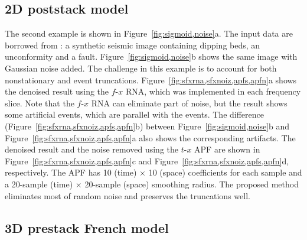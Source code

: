 
\subsection{2D poststack model}
The second example is shown in Figure~\ref{fig:sigmoid,noise}a.  The
input data are borrowed from \cite{Claerbout09}: a synthetic seismic
image containing dipping beds, an unconformity and a
fault. Figure~\ref{fig:sigmoid,noise}b shows the same image with
Gaussian noise added. The challenge in this example is to account for
both nonstationary and event
truncations. Figure~\ref{fig:sfxrna,sfxnoiz,apfs,apfn}a shows the
denoised result using the $f$-$x$ RNA, which was implemented in each
frequency slice. Note that the $f$-$x$ RNA can eliminate part of
noise, but the result shows some artificial events, which are parallel
with the events. The difference
(Figure~\ref{fig:sfxrna,sfxnoiz,apfs,apfn}b) between
Figure~\ref{fig:sigmoid,noise}b and
Figure~\ref{fig:sfxrna,sfxnoiz,apfs,apfn}a also shows the
corresponding artifacts. The denoised result and the noise removed
using the $t$-$x$ APF are shown in
Figure~\ref{fig:sfxrna,sfxnoiz,apfs,apfn}c and
Figure~\ref{fig:sfxrna,sfxnoiz,apfs,apfn}d, respectively. The APF has
10 (time) $\times$ 10 (space) coefficients for each sample and a
20-sample (time) $\times$ 20-sample (space) smoothing radius. The
proposed method eliminates most of random noise and preserves the
truncations well.



\subsection{3D prestack French model}

